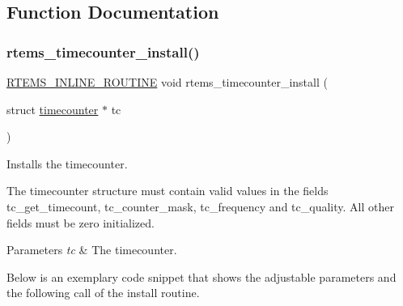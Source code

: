 \subsection{Function Documentation}
\mbox{\label{group__SAPITimecounter_ga8ddad0a976e758ae165036b4399d1470}} 
\subsubsection{\texorpdfstring{rtems\_timecounter\_install()}{rtems\_timecounter\_install()}}
{\footnotesize\ttfamily \mbox{\hyperlink{group__RTEMSScoreBaseDefs_gac216239df231d5dbd15e3520b0b9313f}{R\+T\+E\+M\+S\+\_\+\+I\+N\+L\+I\+N\+E\+\_\+\+R\+O\+U\+T\+I\+NE}} void rtems\+\_\+timecounter\+\_\+install (\begin{DoxyParamCaption}\item[{struct \mbox{\hyperlink{structtimecounter}{timecounter}} $\ast$}]{tc }\end{DoxyParamCaption})}



Installs the timecounter. 

The timecounter structure must contain valid values in the fields tc\+\_\+get\+\_\+timecount, tc\+\_\+counter\+\_\+mask, tc\+\_\+frequency and tc\+\_\+quality. All other fields must be zero initialized.


\begin{DoxyParams}{Parameters}
{\em tc} & The timecounter.\\
\hline
\end{DoxyParams}
Below is an exemplary code snippet that shows the adjustable parameters and the following call of the install routine.


